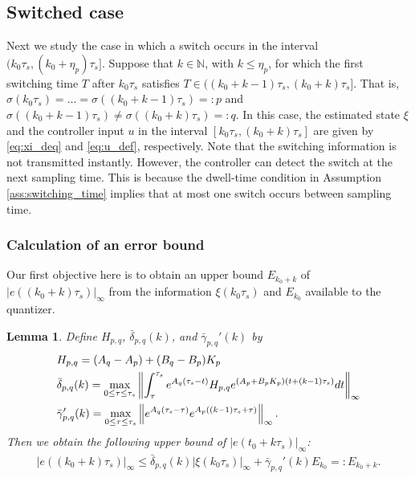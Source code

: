 \documentclass[letterpaper, 11pt, onecolumn]{ieeeconf}  \IEEEoverridecommandlockouts
\newtheorem{lemma}[theorem]{Lemma}
\begin{document}
\subsection{Switched case}
Next we study the case in which a switch
occurs in the interval $(k_0\tau_s, (k_0+\eta_p) \tau_s]$.
Suppose that $k \in \mathbb{N}$, with $k \leq \eta_{p}$, for which
the first switching time $T$ after $k_0\tau_s$ satisfies
$
T \in ((k_0+k-1)\tau_s, (k_0+k) \tau_s].
$
That is, 
$\sigma(k_0\tau_s) =  \dots = \sigma((k_0+k-1) \tau_s) =: p$ and 
$\sigma((k_0+k-1) \tau_s) \not= \sigma((k_0+k) \tau_s) =: q$.
In this case, the estimated state $\xi$ and 
the controller input $u$
in the interval
$[k_0\tau_s, (k_0+k) \tau_s]$ are given 
by \eqref{eq:xi_deq} and \eqref{eq:u_def},
respectively.
Note that 
the switching information is not transmitted instantly. However,
the controller can detect the switch at the next sampling time.
This is because the dwell-time condition in 
Assumption \ref{ass:switching_time} implies that at most one
switch occurs between sampling time. 

\subsubsection{Calculation of an error bound}
Our first objective here is to obtain 
an upper bound $E_{k_0+k}$ of $|e((k_0+k)\tau_s)|_{\infty}$
from the information $\xi(k_0\tau_s)$ and $E_{k_0}$
available to the quantizer.


\begin{lemma}
\label{lem:e_bound_switchedcase1}
{\em
Define $H_{p,q}$, $\bar \delta_{p,q}(k)$, and
$\bar \gamma_{p,q}'(k)$ by
\begin{align}
&H_{p,q} = (A_q - A_p) + (B_q - B_p)K_p \label{eq:Hpq} \\
&\bar \delta_{p,q}(k) = \max_{0\leq \tau \leq \tau_s}
\left\|
\int^{\tau_s}_{\tau}
e^{A_q(\tau_s - t)}H_{p,q} e^{(A_p+B_pK_p)(t+(k-1)\tau_s )} dt 
\right\|_{\infty} \notag\\
&\bar \gamma_{p,q}'(k) = \max_{0\leq \tau \leq \tau_s}
\left\| e^{A_q(\tau_s - \tau)} e^{A_p((k-1)\tau_s + \tau)}
 \right\|_{\infty}. \notag
\end{align}
Then we obtain the following upper bound of $|e(t_0+k \tau_s)|_{\infty}$:
\begin{align}
|e((k_0+k) \tau_s)|_{\infty}
\leq
\bar \delta_{p,q}(k) |\xi (k_0\tau_s)|_{\infty} 
+ \bar \gamma_{p,q}'(k) E_{k_0} =: E_{k_0+k}. \label{eq:Ek0_k_def}
\end{align}
}
\end{lemma}
\end{document}
